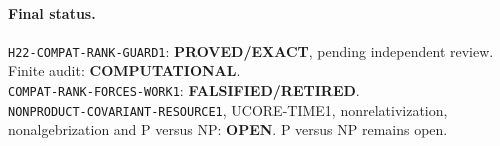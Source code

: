 \documentclass[11pt]{article}
\newcommand{\EXACT}{\textbf{PROVED/EXACT}}
\newcommand{\OPEN}{\textbf{OPEN}}
\newcommand{\RETIRED}{\textbf{FALSIFIED/RETIRED}}
\newcommand{\COMP}{\textbf{COMPUTATIONAL}}
\begin{document}
\paragraph{Final status.}
\texttt{H22-COMPAT-RANK-GUARD1}: \EXACT, pending independent review.\\
Finite audit: \COMP.\\
\texttt{COMPAT-RANK-FORCES-WORK1}: \RETIRED.\\
\texttt{NONPRODUCT-COVARIANT-RESOURCE1}, UCORE-TIME1,
nonrelativization, nonalgebrization and P versus NP: \OPEN.
P versus NP remains open.

\end{document}
